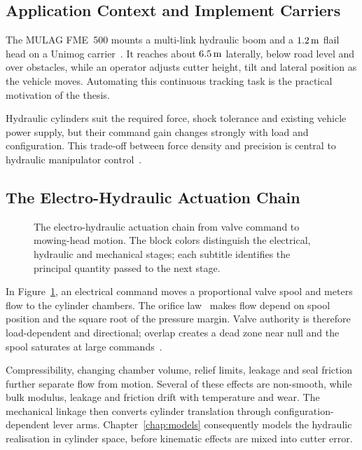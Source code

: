 \subsection{Application Context and Implement Carriers}

The MULAG FME~500 mounts a multi-link hydraulic boom and a
$\unit[1.2]{m}$ flail head on a Unimog carrier~\cite{mulag2026fme500}.
It reaches about $\unit[6.5]{m}$ laterally, below road level and over
obstacles, while an operator adjusts cutter height, tilt and lateral position
as the vehicle moves. Automating this continuous tracking task is the practical
motivation of the thesis.

Hydraulic cylinders suit the required force, shock tolerance and existing
vehicle power supply, but their command gain changes strongly with load and
configuration. This trade-off between force density and precision is central
to hydraulic manipulator control~\cite{mattila2017survey}.

\subsection{The Electro-Hydraulic Actuation Chain}
\label{sec:fund:actuation-chain}

\begin{figure}[H]
  \centering
  
  \caption{The electro-hydraulic actuation chain from valve command to
  mowing-head motion. The block colors distinguish the electrical, hydraulic
  and mechanical stages; each subtitle identifies the principal quantity
  passed to the next stage.}
  \label{fig:fund:chain}
\end{figure}

In Figure~\ref{fig:fund:chain}, an electrical command moves a proportional
valve spool and meters flow to the cylinder chambers. The orifice
law~\cite{merritt1967hydraulic} makes flow depend on spool position and the
square root of the pressure margin. Valve authority is therefore
load-dependent and directional; overlap creates a dead zone near null and the
spool saturates at large commands~\cite{jelali2003hydraulic}.

Compressibility, changing chamber volume, relief limits, leakage and seal
friction further separate flow from motion. Several of these effects are
non-smooth, while bulk modulus, leakage and friction drift with temperature and
wear. The mechanical linkage then converts cylinder translation through
configuration-dependent lever arms. Chapter~\ref{chap:models} consequently
models the hydraulic realisation in cylinder space, before kinematic effects
are mixed into cutter error.

